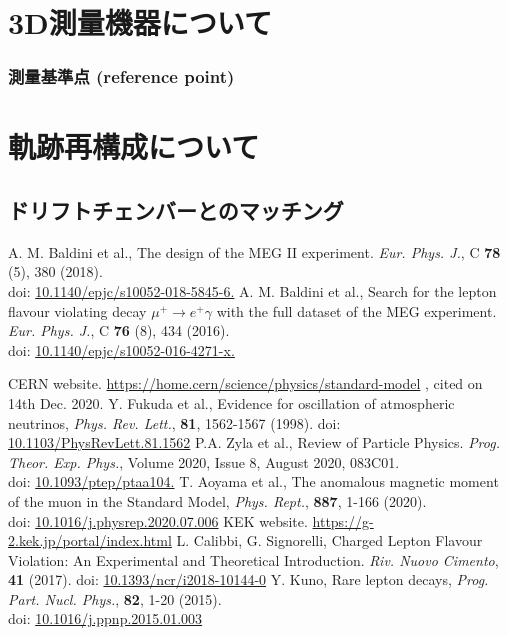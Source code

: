 \documentclass[report]{jsbook}
\begin{document}
\chapter{3D測量機器について}
\subsection{測量基準点 (reference point)}
\chapter{軌跡再構成について}
\section{ドリフトチェンバーとのマッチング}

\begin{thebibliography}{99}
 A. M. Baldini et al., The design of the MEG II experiment. {\it Eur. Phys. J.}, C {\bf 78} (5), 380 (2018). \\ 
doi: \href{https://doi.org/10.1140/epjc/s10052-018-5845-6}{10.1140/epjc/s10052-018-5845-6.}
 A. M. Baldini et al., Search for the lepton flavour violating decay $\mu^+ \to e^+ \gamma$ with the full dataset of the MEG experiment. {\it Eur. Phys. J.}, C {\bf 76} (8), 434 (2016). \\ 
doi: \href{https://doi.org/10.1140/epjc/s10052-016-4271-x}{10.1140/epjc/s10052-016-4271-x.}

 CERN website. \url{https://home.cern/science/physics/standard-model} , cited on 14th Dec. 2020.
 Y. Fukuda et al., Evidence for oscillation of atmospheric neutrinos, {\it Phys. Rev. Lett.}, {\bf 81}, 1562-1567 (1998). 
doi: \href{https://doi.org/10.1103/PhysRevLett.81.1562}{10.1103/PhysRevLett.81.1562}
 P.A. Zyla et al., Review of Particle Physics.  {\it Prog. Theor. Exp. Phys.}, Volume 2020, Issue 8, August 2020, 083C01. \\
doi: \href{https://doi.org/10.1093/ptep/ptaa104}{10.1093/ptep/ptaa104.}
 T. Aoyama et al., The anomalous magnetic moment of the muon in the Standard Model, {\it Phys. Rept.}, {\bf 887}, 1-166 (2020). \\
doi: \href{https://doi.org/10.1016/j.physrep.2020.07.006}{10.1016/j.physrep.2020.07.006}
 KEK website. \url{https://g-2.kek.jp/portal/index.html}
 L. Calibbi, G. Signorelli, Charged Lepton Flavour Violation: An Experimental and Theoretical Introduction. {\it Riv. Nuovo Cimento}, {\bf 41} (2017).
doi: \href{https://doi.org/10.1393/ncr/i2018-10144-0}{10.1393/ncr/i2018-10144-0}
 Y. Kuno, Rare lepton decays, {\it Prog. Part. Nucl. Phys.}, {\bf 82}, 1-20 (2015). \\
doi: \href{https://doi.org/10.1016/j.ppnp.2015.01.003}{10.1016/j.ppnp.2015.01.003}



\end{thebibliography}
\end{document}
